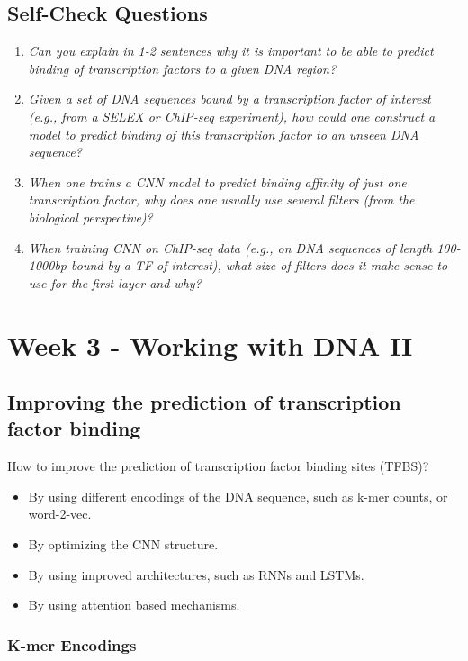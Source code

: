 \documentclass[a4paper]{article}
\begin{document}
\subsection*{Self-Check Questions}

\begin{enumerate}
  \item \textit{Can you explain in 1-2 sentences why it is important to be able to 
  predict binding of transcription factors to a given DNA region?}
  \item \textit{Given a set of DNA sequences bound by a transcription factor of interest
  (e.g., from a SELEX or ChIP-seq experiment), how could one construct a model
  to predict binding of this transcription factor to an unseen DNA sequence?}
  \item \textit{When one trains a CNN model to predict binding affinity of just one
  transcription factor, why does one usually use several filters (from the
  biological perspective)?}
  \item \textit{When training CNN on ChIP-seq data (e.g., on DNA sequences of length
  100-1000bp bound by a TF of interest), what size of filters does it make sense
  to use for the first layer and why?}
\end{enumerate}


\newpage

\section*{Week 3 - Working with DNA II}

\subsection*{Improving the prediction of transcription factor binding}

How to improve the prediction of transcription factor binding sites (TFBS)? 

\begin{itemize}
  \item By using different encodings of the DNA sequence, such as k-mer counts, or word-2-vec.
  \item By optimizing the CNN structure.
  \item By using improved architectures, such as RNNs and LSTMs.
  \item By using attention based mechanisms.
\end{itemize}

\subsubsection*{K-mer Encodings}
\end{document}

